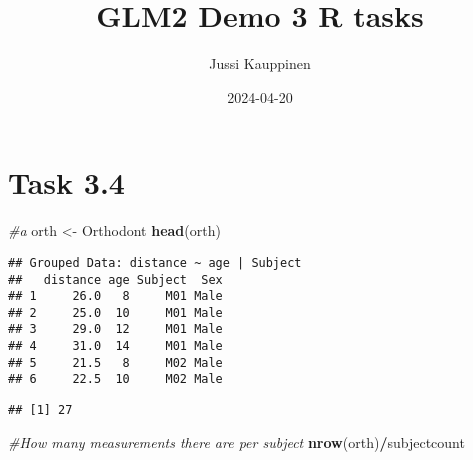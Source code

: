 \documentclass[
]{article}
\title{GLM2 Demo 3 R tasks}
\author{Jussi Kauppinen}
\date{2024-04-20}
\newenvironment{Shaded}{\begin{snugshade}}{\end{snugshade}}
\newcommand{\CommentTok}[1]{\textcolor[rgb]{0.56,0.35,0.01}{\textit{#1}}}
\newcommand{\FunctionTok}[1]{\textcolor[rgb]{0.13,0.29,0.53}{\textbf{#1}}}
\newcommand{\NormalTok}[1]{#1}
\newcommand{\OtherTok}[1]{\textcolor[rgb]{0.56,0.35,0.01}{#1}}
\newcommand{\SpecialCharTok}[1]{\textcolor[rgb]{0.81,0.36,0.00}{\textbf{#1}}}
\begin{document}
\maketitle

\hypertarget{task-3.4}{%
\section{Task 3.4}\label{task-3.4}}

\begin{Shaded}
\begin{Highlighting}[]
\CommentTok{\#a}
\NormalTok{orth }\OtherTok{\textless{}{-}}\NormalTok{ Orthodont}
\FunctionTok{head}\NormalTok{(orth)}
\end{Highlighting}
\end{Shaded}

\begin{verbatim}
## Grouped Data: distance ~ age | Subject
##   distance age Subject  Sex
## 1     26.0   8     M01 Male
## 2     25.0  10     M01 Male
## 3     29.0  12     M01 Male
## 4     31.0  14     M01 Male
## 5     21.5   8     M02 Male
## 6     22.5  10     M02 Male
\end{verbatim}

\begin{Shaded}
\end{Shaded}

\begin{verbatim}
## [1] 27
\end{verbatim}

\begin{Shaded}
\begin{Highlighting}[]
\CommentTok{\#How many measurements there are per subject}
\FunctionTok{nrow}\NormalTok{(orth)}\SpecialCharTok{/}\NormalTok{subjectcount}
\end{Highlighting}
\end{Shaded}
\end{document}
